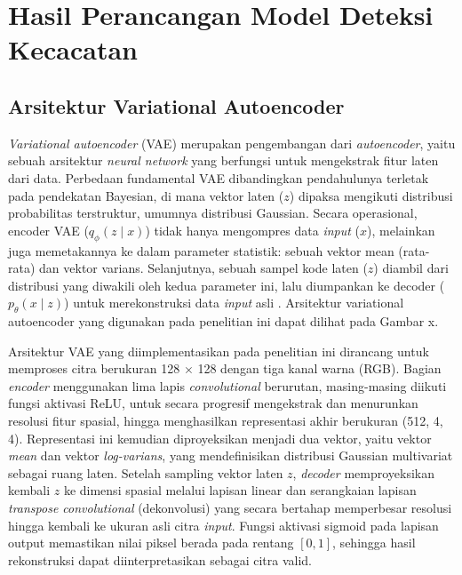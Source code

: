\vspace{1em}

\section{Hasil Perancangan Model Deteksi Kecacatan}
\subsection{Arsitektur Variational Autoencoder}
\textit{Variational autoencoder} (VAE) merupakan pengembangan dari
\textit{autoencoder}, yaitu sebuah arsitektur \textit{neural network}
yang berfungsi untuk mengekstrak fitur laten dari data. Perbedaan
fundamental VAE dibandingkan pendahulunya terletak pada pendekatan
Bayesian, di mana vektor laten ($z$) dipaksa mengikuti distribusi
probabilitas terstruktur, umumnya distribusi Gaussian. Secara
operasional, encoder VAE ($q_{\phi}(z \mid x)$) tidak hanya
mengompres data \textit{input} ($x$), melainkan juga memetakannya
ke dalam parameter statistik: sebuah vektor mean (rata-rata) dan
vektor varians. Selanjutnya, sebuah sampel kode laten ($z$) diambil
dari distribusi yang diwakili oleh kedua parameter ini, lalu diumpankan
ke decoder ($p_{\theta}(x \mid z)$) untuk merekonstruksi data \textit{input}
asli \citep{25}. Arsitektur variational autoencoder yang digunakan pada
penelitian ini dapat dilihat pada Gambar x.

Arsitektur VAE yang diimplementasikan pada penelitian ini dirancang
untuk memproses citra berukuran 128 $\times$ 128 dengan tiga kanal
warna (RGB). Bagian \textit{encoder} menggunakan lima lapis
\textit{convolutional} berurutan, masing-masing diikuti fungsi
aktivasi ReLU, untuk secara progresif mengekstrak dan menurunkan
resolusi fitur spasial, hingga menghasilkan representasi akhir
berukuran (512, 4, 4). Representasi ini kemudian diproyeksikan
menjadi dua vektor, yaitu vektor
\textit{mean} dan vektor \textit{log-varians}, yang mendefinisikan
distribusi Gaussian
multivariat sebagai ruang laten. Setelah sampling vektor laten $z$,
\textit{decoder} memproyeksikan kembali $z$ ke dimensi spasial melalui lapisan
linear dan serangkaian lapisan \textit{transpose convolutional}
(dekonvolusi) yang secara bertahap memperbesar resolusi hingga
kembali ke ukuran asli citra \textit{input}. Fungsi aktivasi sigmoid pada
lapisan output memastikan nilai piksel berada pada rentang $[0, 1]$,
sehingga hasil rekonstruksi dapat diinterpretasikan sebagai citra valid.

\vspace{1em}

